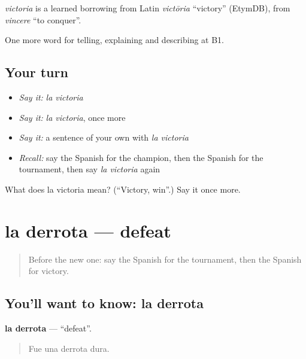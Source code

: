 \begin{cousinweb}
\emph{victoria} is a learned borrowing from Latin \emph{victōria} \textquotedblleft{}victory\textquotedblright{} (EtymDB), from \emph{vincere} \textquotedblleft{}to conquer\textquotedblright{}.
\end{cousinweb}

\begin{grammarlens}[title={What you've built}]
One more word for telling, explaining and describing at B1.
\end{grammarlens}

\subsection*{Your turn}
\begin{itemize}
\raggedright
  \item \emph{Say it:} \emph{la victoria}
  \item \emph{Say it:} \emph{la victoria}, once more
  \item \emph{Say it:} a sentence of your own with \emph{la victoria}
  \item \emph{Recall:} say the Spanish for the champion, then the Spanish for the tournament, then say \emph{la victoria} again
\end{itemize}

\begin{tcolorbox}[breakable,colback=teal!4,colframe=teal!35!black,title={Before you move on}]
What does la victoria mean? (\textquotedblleft{}Victory, win\textquotedblright{}.) Say it once more.
\end{tcolorbox}
\section[la derrota]{la derrota — defeat}

\label{lesson:ES-C757-derrota}



\begin{quote}
Before the new one: say the Spanish for the tournament, then the Spanish for victory.
\end{quote}

\subsection*{You'll want to know: la derrota}
\textbf{la derrota} — \textquotedblleft{}defeat\textquotedblright{}.

\begin{quote}
Fue una derrota dura.
\end{quote}

